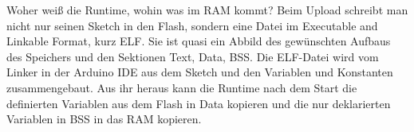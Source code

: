 Woher weiß die Runtime, wohin was im RAM kommt? Beim Upload schreibt man nicht nur seinen Sketch in den Flash, sondern eine Datei im Executable and Linkable Format, kurz ELF. Sie ist quasi ein Abbild des gewünschten Aufbaus des Speichers und den Sektionen Text, Data, BSS. Die ELF-Datei wird vom Linker in der Arduino IDE aus dem Sketch und den Variablen und Konstanten zusammengebaut. Aus ihr heraus kann die Runtime nach dem Start die definierten Variablen aus dem Flash in Data kopieren und die nur deklarierten Variablen in BSS in das RAM kopieren.







